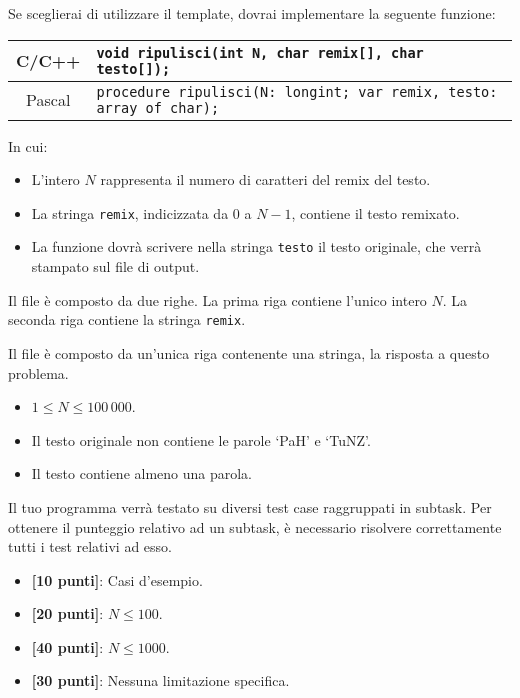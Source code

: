 Se sceglierai di utilizzare il template, dovrai implementare la seguente funzione:
\begin{center}\begin{tabularx}{\textwidth}{|c|X|}
\hline
C/C++  & \verb|void ripulisci(int N, char remix[], char testo[]);|\\
\hline
Pascal & \verb|procedure ripulisci(N: longint; var remix, testo: array of char);|\\
\hline
\end{tabularx}\end{center}
In cui:
\begin{itemize}[nolistsep]
  \item L'intero $N$ rappresenta il numero di caratteri del remix del testo.
  \item La stringa \texttt{remix}, indicizzata da $0$ a $N-1$, contiene il testo remixato.
  \item La funzione dovrà scrivere nella stringa \texttt{testo} il testo originale, che verrà stampato sul file di output.
\end{itemize}

\InputFile
Il file  è composto da due righe. La prima riga contiene l'unico intero $N$. La seconda riga contiene la stringa \texttt{remix}.

\OutputFile
Il file \outputfile{} è composto da un'unica riga contenente una stringa, la risposta a questo problema.

\pagebreak
\Constraints
\begin{itemize}[nolistsep, itemsep=2mm]
	\item $1 \le N \le 100\,000$.
	\item Il testo originale non contiene le parole `PaH' e `TuNZ'.
	\item Il testo contiene almeno una parola.
\end{itemize}

\Scoring
Il tuo programma verrà testato su diversi test case raggruppati in subtask.
Per ottenere il punteggio relativo ad un subtask, è necessario risolvere
correttamente tutti i test relativi ad esso.

\begin{itemize}[nolistsep,itemsep=2mm]
  \item \textbf{ [10 punti]}: Casi d'esempio.
  \item \textbf{ [20 punti]}: $N \leq 100$.
  \item \textbf{ [40 punti]}: $N \leq 1000$.
  \item \textbf{ [30 punti]}: Nessuna limitazione specifica.
\end{itemize}

\Examples
\begin{example}
%
\end{example}
\begin{example}
%
\end{example}
